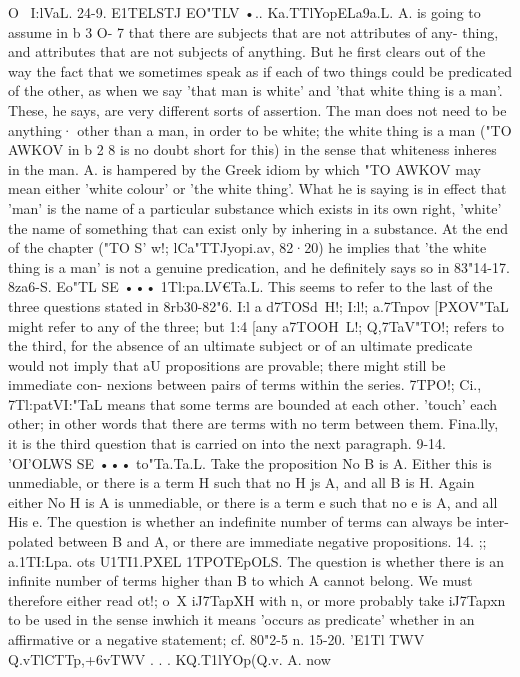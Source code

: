 {{{{{{{{{{{{{{{{O~
I:lVaL.
24-9. E1TELSTJ EO"TLV •.. Ka.TTlYopELa9a.L. A. is going to assume
in b 3 O- 7 that there are subjects that are not attributes of any-
thing, and attributes that are not subjects of anything. But he
first clears out of the way the fact that we sometimes speak as if
each of two things could be predicated of the other, as when we
say 'that man is white' and 'that white thing is a man'. These,
he says, are very different sorts of assertion. The man does not
need to be anything· other than a man, in order to be white; the
white thing is a man ("TO AWKOV in b 2 8 is no doubt short for this)
in the sense that whiteness inheres in the man. A. is hampered
by the Greek idiom by which "TO AWKOV may mean either 'white
colour' or 'the white thing'. What he is saying is in effect that
'man' is the name of a particular substance which exists in its
own right, 'white' the name of something that can exist only by
inhering in a substance. At the end of the chapter ("TO S' w!;
lCa"TTJyopi.av, 82·20) he implies that 'the white thing is a man' is
not a genuine predication, and he definitely says so in 83"14-17.
8za6-S. Eo"TL SE ••• 1Tl:pa.LV€Ta.L. This seems to refer to the last
of the three questions stated in 8rb30-82"6. I:l a{ d7TOSd~H!; I:l!;
a.7Tnpov [PXOV"TaL might refer to any of the three; but 1:4 [any
a7TOOH~L!; Q,7TaV"TO!; refers to the third, for the absence of an ultimate
subject or of an ultimate predicate would not imply that aU
propositions are provable; there might still be immediate con-
nexions between pairs of terms within the series. 7TPO!; Ci.,\ATJAa
7Tl:patVI:"TaL means that some terms are bounded at each other.
'touch' each other; in other words that there are terms with no
term between them. Fina.lly, it is the third question that is
carried on into the next paragraph.
9-14. 'OI'OLWS SE ••• to"Ta.Ta.L. Take the proposition No B is A.
Either this is unmediable, or there is a term H such that no H js
A, and all B is H. Again either No H is A is unmediable, or there
is a term e such that no e is A, and all His e. The question
is whether an indefinite number of terms can always be inter-
polated between B and A, or there are immediate negative
propositions.
14. ;; a.1TI:Lpa. ots U1TI1.PXEL 1TPOTEpOLS. The question is whether
there is an infinite number of terms higher than B to which A
cannot belong. We must therefore either read ot!; o~X iJ7TapXH
with n, or more probably take iJ7Tapxn to be used in the sense inwhich it means 'occurs as predicate' whether in an affirmative
or a negative statement; cf. 80"2-5 n.
15-20. 'E1Tl
TWV Q.vTlCTTp,+6vTWV . . . KQ.T1lYOp(Q.v. A. now
}}}}}}}}}}}}}}}}}
